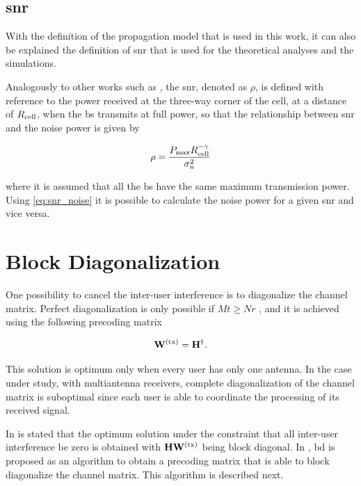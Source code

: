\subsection{\gls{snr}} \label{ssec:snr}

With the definition of the propagation model that is used in this work, it can
also be explained the definition of \gls{snr} that is used for the theoretical
analyses and the simulations.

Analogously to other works such as \cite{zhang09}, the \gls{snr}, denoted as
$\rho$, is defined with reference to the power received at the three-way corner
of the cell, at a distance of $R_{\text{cell}}$, when the \gls{bs} transmits at
full power, so that the relationship between \gls{snr} and the noise power is
given by

\begin{equation} \label{eq:snr_noise}
    \rho = \frac{P_{\max}R_{\text{cell}}^{-\gamma}}{\sigma_n^2}
\end{equation}

\noindent
where it is assumed that all the \gls{bs} have the same maximum transmission
power. Using \eqref{eq:snr_noise} it is possible to calculate the noise power for a
given \gls{snr} and vice versa.

\section{Block Diagonalization}\label{sec:bd}

One possibility to cancel the inter-user interference is to diagonalize the
channel matrix. Perfect diagonalization is only possible if $Mt \geq Nr$
\cite{caire03}, and it is achieved using the following precoding matrix

\begin{equation} \label{eq:zf_precod}
    \mathbf{W}^{(\text{tx})} = \mathbf{H}^\dagger.
\end{equation}

This solution is optimum only when every user has only one antenna. In the case
under study, with multiantenna receivers, complete diagonalization of the
channel matrix is suboptimal since each user is able to coordinate the
processing of its received signal.

In \cite{spencer04} is stated that the optimum solution under the constraint
that all inter-user interference be zero is obtained with $\mathbf{H} \mathbf{W}^{(\text{tx})}$ being
block diagonal. In \cite{spencer04}, \gls{bd} is proposed as an algorithm to
obtain a precoding matrix that is able to block diagonalize the channel matrix.
This algorithm is described next.

